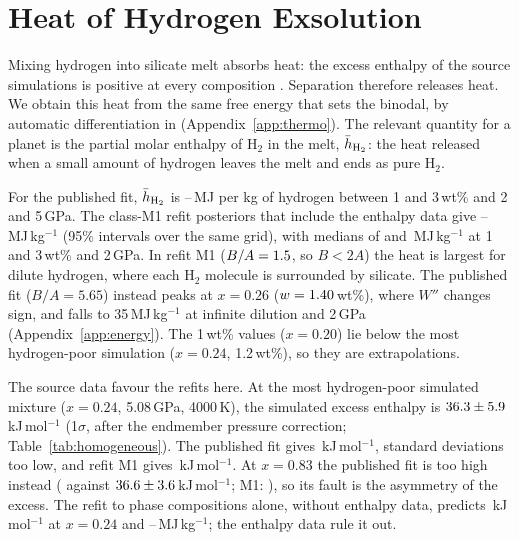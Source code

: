 
\section{Heat of Hydrogen Exsolution}\label{sec:heat}

Mixing hydrogen into silicate melt absorbs heat: the excess enthalpy of the source
simulations is positive at every composition \cite{gilmore2026data}. Separation therefore
releases heat. We obtain this heat from the same free energy that sets the binodal, by
automatic differentiation in \Atm{} (Appendix~\ref{app:thermo}). The relevant quantity for a
planet is the partial molar enthalpy of H$_2$ in the melt, $\bar h_{\rm H_2}$: the heat
released when a small amount of hydrogen leaves the melt and ends as pure H$_2$.

For the published fit, $\bar h_{\rm H_2}$ is \hbarPubLo{}--\hbarPubHi{}\,MJ per kg of hydrogen
between 1 and 3\,wt\% and 2 and 5\,GPa. The class-M1 refit posteriors that include the
enthalpy data give \hbarMOneLo{}--\hbarMOneHi{}\,MJ\,kg$^{-1}$ (95\% intervals over the same
grid), with medians of \hbarMOneTableOne{} and \hbarMOneTableThree{}\,MJ\,kg$^{-1}$ at 1 and
3\,wt\% and 2\,GPa. In refit M1 ($B/A = 1.5{}$, so $B < 2A$) the heat is largest for
dilute hydrogen, where each H$_2$ molecule is surrounded by silicate. The published fit
($B/A = 5.65$) instead peaks at $x = 0.26$ ($w = 1.40{}$\,wt\%), where $W''$ changes
sign, and falls to 35\,MJ\,kg$^{-1}$ at infinite dilution and 2\,GPa
(Appendix~\ref{app:energy}). The 1\,wt\% values ($x = 0.20$) lie below the most hydrogen-poor
simulation ($x = 0.24$, 1.2\,wt\%), so they are extrapolations.

The source data favour the refits here. At the most hydrogen-poor simulated mixture
($x = 0.24$, 5.08\,GPa, 4000\,K), the simulated excess enthalpy is
$36.3\pm5.9$\,kJ\,mol$^{-1}$ (1$\sigma$, after the endmember pressure correction;
Table~\ref{tab:homogeneous}). The published fit gives \edHexPub{}\,kJ\,mol$^{-1}$,
\edHexPull{} standard deviations too low, and refit M1 gives \edHexMOne{}\,kJ\,mol$^{-1}$. At
$x = 0.83$ the published fit is too high instead (\edHexRichPub{} against
$36.6\pm3.6$\,kJ\,mol$^{-1}$; M1: \edHexRichMOne{}), so its fault is the
asymmetry of the excess. The refit to phase compositions alone, without enthalpy data, predicts
\edHexPhaseComp{}\,kJ\,mol$^{-1}$ at $x = 0.24$ and
\hbarPhaseCompLo{}--\hbarPhaseCompHi{}\,MJ\,kg$^{-1}$; the enthalpy data rule it out.


